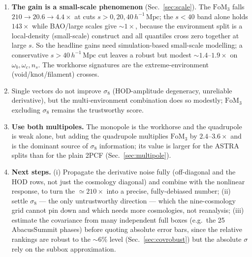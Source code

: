 \documentclass[11pt]{article}
\newcommand{\Mpch}{\,h^{-1}\,\mathrm{Mpc}}
\newcommand{\FoM}{\mathrm{FoM}}
\newcommand{\code}[1]{\texttt{#1}}
\begin{document}
\begin{enumerate}
  \emph{just the two} void/knot random crosses,
  \code{full}$+$\code{xrQ4}$+$\code{xrQ1}, already give $\FoM_3 = 48\times$
  ($\omega_b\,2.8\times$, $\omega_c\,3.6\times$, $n_s\,3.1\times$;
  $\sigma_8\,1.2\times$) --- more than the five-stem data-leg vector
  (Fig.~\ref{fig:corner}).
\item \textbf{The gain is a small-scale phenomenon} (Sec.~\ref{sec:scale}).  The
  $\FoM_3$ falls $210\to20.6\to4.4\times$ at cuts $s>0,20,40\Mpch$; the $s<40$
  band alone holds $143\times$ while BAO/large scales give $\sim\!1\times$, because
  the environment split is a local-density (small-scale) construct and all
  quantiles cross zero together at large $s$.  So the headline gains need
  simulation-based small-scale modelling; a conservative $s>40\Mpch$ cut leaves a
  robust but modest $\sim\!1.4$--$1.9\times$ on $\omega_b,\omega_c,n_s$.  The
  workhorse signatures are the extreme-environment (void/knot/filament) crosses.
\item Single vectors do not improve $\sigma_8$ (HOD-amplitude degeneracy,
  unreliable derivative), but the multi-environment combination does so modestly;
  $\FoM_3$ excluding $\sigma_8$ remains the trustworthy score.
\item \textbf{Use both multipoles.}  The monopole is the workhorse and the
  quadrupole is weak alone, but adding the quadrupole multiplies $\FoM_3$ by
  $2.4$--$3.6\times$ and is the dominant source of $\sigma_8$ information; its
  value is larger for the ASTRA splits than for the plain 2PCF
  (Sec.~\ref{sec:multipole}).
\item \textbf{Next steps.}  (i) Propagate the derivative noise fully (off-diagonal
  and the HOD rows, not just the cosmology diagonal) and combine with the nonlinear
  response, to turn the $\simeq\!210\times$ into a precise, fully-debiased number;
  (ii) settle $\sigma_8$ --- the only untrustworthy direction --- which the
  nine-cosmology grid cannot pin down and which needs more cosmologies, not
  reanalysis; (iii) estimate the covariance from many independent full boxes
  (e.g.\ the 25 AbacusSummit phases) before quoting absolute error bars, since the
  relative rankings are robust to the $\sim\!6\%$ level (Sec.~\ref{sec:covrobust})
  but the absolute $\sigma$ rely on the subbox approximation.
\end{enumerate}
\end{document}
